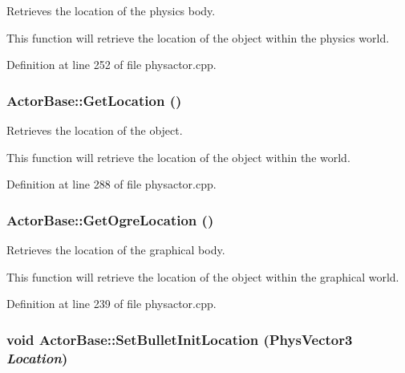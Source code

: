 Retrieves the location of the physics body. 

This function will retrieve the location of the object within the physics world. 

Definition at line 252 of file physactor.cpp.

\hypertarget{classActorBase_a9dfdaf0304e4a462b3b033fb254116af}{
\subsubsection[{GetLocation}]{ ActorBase::GetLocation ()}}
\label{dd/d7b/classActorBase_a9dfdaf0304e4a462b3b033fb254116af}


Retrieves the location of the object. 

This function will retrieve the location of the object within the world. 

Definition at line 288 of file physactor.cpp.

\hypertarget{classActorBase_a73ee03084b2ca78659b6e6439cafa75f}{
\subsubsection[{GetOgreLocation}]{ ActorBase::GetOgreLocation ()}}
\label{dd/d7b/classActorBase_a73ee03084b2ca78659b6e6439cafa75f}


Retrieves the location of the graphical body. 

This function will retrieve the location of the object within the graphical world. 

Definition at line 239 of file physactor.cpp.

\hypertarget{classActorBase_af52177760d530df2b0987ed8626a656d}{
\subsubsection[{SetBulletInitLocation}]{\setlength{\rightskip}{0pt plus 5cm}void ActorBase::SetBulletInitLocation ({\bf PhysVector3} {\em Location})}}
\label{dd/d7b/classActorBase_af52177760d530df2b0987ed8626a656d}


